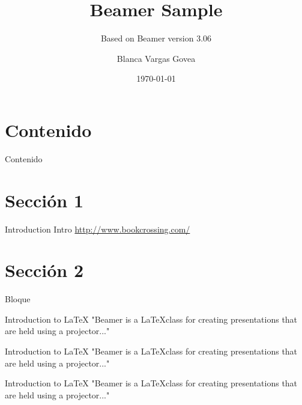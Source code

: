 \documentclass[xcolor=dvipsnames]{beamer}
\begin{document}
\title{Beamer Sample}
\subtitle{Based on Beamer version 3.06}
\author{Blanca Vargas Govea}
\date{\today}

\begin{frame}[plain] 
  \titlepage
\end{frame}
\section*{Contenido}
\begin{frame}{Contenido}
  \tableofcontents%
\end{frame}
\section{Secci\'{o}n 1}
\begin{frame}{Introduction}
Intro
\url{http://www.bookcrossing.com/}
\end{frame}

\section{Secci\'{o}n 2}

\begin{frame}{Bloque}
\begin{block}{Introduction to {\LaTeX}}
"Beamer is a {\LaTeX}class for creating presentations
that are held using a projector..."
\end{block}

\begin{example}{Introduction to {\LaTeX}}
"Beamer is a {\LaTeX}class for creating presentations
that are held using a projector..."
\end{example}

\begin{alertblock}{Introduction to {\LaTeX}}
"Beamer is a {\LaTeX}class for creating presentations
that are held using a projector..."
\end{alertblock}

\end{frame}
%
%
\end{document}
